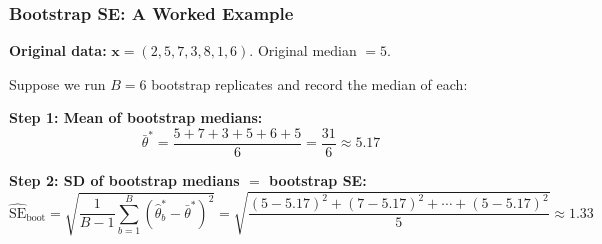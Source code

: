 \documentclass[aspectratio=169]{beamer}
\begin{document}
\begin{frame}
\frametitle{Bootstrap SE: A Worked Example}

\small
\textbf{Original data:} $\mathbf{x} = (2, 5, 7, 3, 8, 1, 6)$. \; Original median $= 5$.

\vspace{0.15cm}
Suppose we run $B = 6$ bootstrap replicates and record the median of each:

\vspace{0.15cm}
\begin{center}
\end{center}

\pause
\vspace{0.1cm}
\textbf{Step 1: Mean of bootstrap medians:}
$$\bar{\theta}^* = \frac{5 + 7 + 3 + 5 + 6 + 5}{6} = \frac{31}{6} \approx 5.17$$

\pause
\textbf{Step 2: SD of bootstrap medians $=$ bootstrap SE:}
$$\widehat{\text{SE}}_{\text{boot}} = \sqrt{\frac{1}{B-1}\sum_{b=1}^{B}(\hat\theta_b^* - \bar{\theta}^*)^2} = \sqrt{\frac{(5{-}5.17)^2 + (7{-}5.17)^2 + \cdots + (5{-}5.17)^2}{5}} \approx 1.33$$

\pause
\vspace{0.1cm}
\begin{center}
\end{center}
\end{frame}
\end{document}
